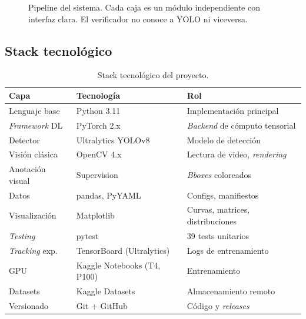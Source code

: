 \documentclass[journal,onecolumn,11pt]{IEEEtran}
\begin{document}
\begin{figure}[H]
    \centering
    \footnotesize\ttfamily
    \caption{Pipeline del sistema. Cada caja es un módulo
    independiente con interfaz clara. El verificador no conoce a
    YOLO ni viceversa.}
    \label{fig:arquitectura}
\end{figure}

\subsection{Stack tecnológico}

\begin{table}[H]
\centering
\caption{Stack tecnológico del proyecto.}
\label{tab:stack}
\begin{tabular}{lll}
\toprule
\textbf{Capa} & \textbf{Tecnología} & \textbf{Rol} \\
\midrule
Lenguaje base & Python 3.11 & Implementación principal \\
\textit{Framework} DL & PyTorch 2.x & \textit{Backend} de cómputo tensorial \\
Detector & Ultralytics YOLOv8 \cite{ultralytics2023} & Modelo de detección \\
Visión clásica & OpenCV 4.x & Lectura de video, \textit{rendering} \\
Anotación visual & Supervision \cite{supervision} & \textit{Bboxes} coloreados \\
Datos & pandas, PyYAML & Configs, manifiestos \\
Visualización & Matplotlib & Curvas, matrices, distribuciones \\
\textit{Testing} & pytest & 39 tests unitarios \\
\textit{Tracking} exp. & TensorBoard (Ultralytics) & Logs de entrenamiento \\
GPU & Kaggle Notebooks (T4, P100) & Entrenamiento \\
Datasets & Kaggle Datasets & Almacenamiento remoto \\
Versionado & Git + GitHub & Código y \textit{releases} \\
\bottomrule
\end{tabular}
\end{table}
\end{document}
